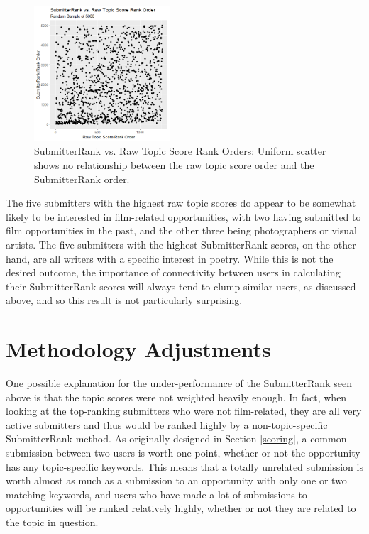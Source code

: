\documentclass[]{report}   %
\begin{document}
\begin{figure}[h]
    \centering
    \begin{minipage}{0.9\textwidth}
	\captionsetup{font=scriptsize}
        \centering
        \includegraphics[width=0.45\textwidth]{rankOrder5000_orig.png} %
        \caption{SubmitterRank vs. Raw Topic Score Rank Orders: Uniform scatter shows no relationship between the raw topic score order and the SubmitterRank order.}
	  \label{fig:5000cor_orig}
    \end{minipage}
 \end{figure}

The five submitters with the highest raw topic scores do appear to be somewhat likely to be interested in film-related opportunities, with two having submitted to film opportunities in the past, and the other three being photographers or visual artists. The five submitters with the highest SubmitterRank scores, on the other hand, are all writers with a specific interest in poetry. While this is not the desired outcome, the importance of connectivity between users in calculating their SubmitterRank scores will always tend to clump similar users, as discussed above, and so this result is not particularly surprising.

\section{Methodology Adjustments}

One possible explanation for the under-performance of the SubmitterRank seen above is that the topic scores were not weighted heavily enough. In fact, when looking at the top-ranking submitters who were not film-related, they are all very active submitters and thus would be ranked highly by a non-topic-specific SubmitterRank method. As originally designed in Section \ref{scoring}, a common submission between two users is worth one point, whether or not the opportunity has any topic-specific keywords. This means that a totally unrelated submission is worth almost as much as a submission to an opportunity with only one or two matching keywords, and users who have made a lot of submissions to opportunities will be ranked relatively highly, whether or not they are related to the topic in question.
\end{document}
